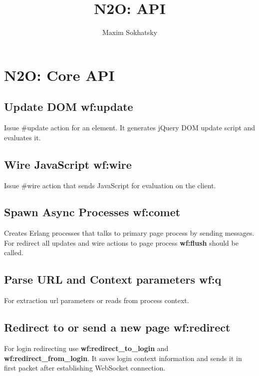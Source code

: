 \documentclass[11pt]{article}
\begin{document}
\title{N2O: API}
\author{Maxim Sokhatsky}

\paragraph{}
\section*{N2O: Core API}

\subsection*{Update DOM \bf{wf:update}}
Issue #update{} action for an element.
It generates jQuery DOM update script and evaluates it.

\subsection*{Wire JavaScript \bf{wf:wire}}
Issue #wire{} action that sends JavaScript for evaluation on the client.

\subsection*{Spawn Async Processes \bf{wf:comet}}
Creates Erlang processes that talks to primary page process by sending messages.
For redirect all updates and wire actions to page process {\bf wf:flush} should be called.

\subsection*{Parse URL and Context parameters \bf{wf:q}}
For extraction url parameters or reads from process context.

\subsection*{Redirect to or send a new page \bf{wf:redirect}}
For login redirecting use {\bf{wf:redirect_to_login}} and {\bf{wf:redirect_from_login}}.
It saves login context information and sends it in first packet after establishing WebSocket connection.
\end{document}
